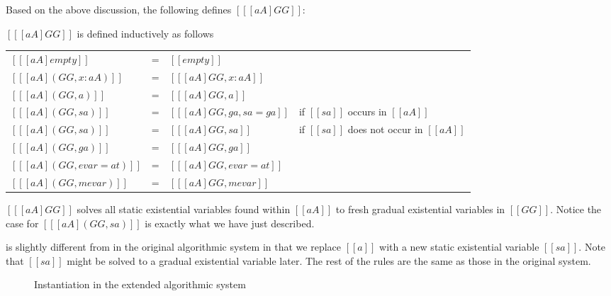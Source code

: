 Based on the above discussion, the following defines $[[ [aA]GG ]]$:
\begin{definition}$[[ [aA]GG ]]$ is defined inductively as follows  \label{def:contamination} %
  \begin{center}
    \begin{tabular}{llll} \toprule
     $[[ [aA] empty    ]]$ & = &  $[[empty]]$  & \\
    $[[ [aA] (GG, x : aA)  ]]$ &=& $[[ [aA] GG , x : aA     ]]$ & \\
    $[[ [aA] (GG, a)  ]]$ &=& $[[ [aA] GG , a     ]]$ & \\
    $[[ [aA] (GG, sa)  ]]$ &=& $[[ [aA] GG , ga , sa = ga  ]]$  & if $[[sa]]$ occurs in $[[aA]]$     \\
    $[[ [aA] (GG, sa)  ]]$ &=& $[[ [aA] GG , sa     ]]$     & if $[[sa]]$ does not occur in $[[aA]]$  \\
    $[[ [aA] (GG, ga)  ]]$ &=& $[[ [aA] GG , ga     ]]$ & \\
    $[[ [aA] (GG, evar = at)  ]]$ &=& $[[ [aA] GG , evar = at     ]]$ & \\
    $[[ [aA] (GG, mevar)  ]]$ &=& $[[ [aA] GG , mevar     ]]$ & \\ \bottomrule
    \end{tabular}
  \end{center}
\end{definition}
\noindent $[[ [aA]GG ]]$ solves all static existential variables found within $[[aA]]$ to fresh
gradual existential variables in $[[GG]]$. Notice the case for $[[ [aA] (GG, sa)]]$
is exactly what we have just described.

 is slightly different from  in the original
algorithmic system in that we replace $[[a]]$ with a new static existential
variable $[[sa]]$. Note that $[[sa]]$ might be solved to a gradual existential
variable later. The rest of the rules are the same as those in the original system.


\begin{figure}[t]
  \centering
  \begin{small}


  \end{small}

  \caption{Instantiation in the extended algorithmic system}
  \label{fig:exd:inst}

\end{figure}


